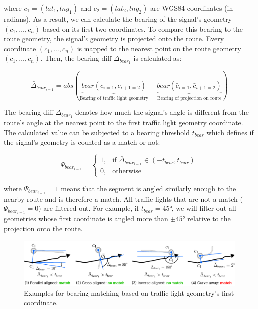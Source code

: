 where $c_1 = (lat_1, lng_1)$ and $c_2 = (lat_2, lng_2)$ are WGS84 coordinates (in radians). As a result, we can calculate the bearing of the signal's geometry $(c_1, \dots, c_n)$ based on its first two coordinates. To compare this bearing to the route geometry, the signal's geometry is projected onto the route. Every coordinate $(c_1, \dots, c_n)$ is mapped to the nearest point on the route geometry $(\bar{c_1}, \dots, \bar{c_n})$. Then, the bearing diff $\bar{\Delta}_{bear_1}$ is calculated as:

\begin{equation}
    \bar{\Delta}_{bear_{i=1}} = 
        abs(\underbrace{bear(c_{i=1}, c_{i+1=2})}_{\text{Bearing of traffic light geometry}} - \underbrace{bear(\bar{c}_{i=1}, \bar{c}_{i+1=2})}_{\text{Bearing of projection on route}})
\end{equation}

The bearing diff $\bar{\Delta}_{bear_1}$ denotes how much the signal's angle is different from the route's angle at the nearest point to the first traffic light geometry coordinate. The calculated value can be subjected to a bearing threshold $t_{bear}$ which defines if the signal's geometry is counted as a match or not:

\begin{equation}
\Psi_{bear_{i=1}} = 
    \begin{cases}
            1,& \text{if } \bar{\Delta}_{bear_{i=1}} \in \left(-t_{bear}, t_{bear}\right)\\
            0,              & \text{otherwise}
        \end{cases}
\end{equation}

where $\Psi_{bear_{i=1}} = 1$ means that the segment is angled similarly enough to the nearby route and is therefore a match. All traffic lights that are not a match ($\Psi_{bear_{i=1}} = 0$) are filtered out. For example, if $t_{bear} = 45°$, we will filter out all geometries whose first coordinate is angled more than $\pm 45°$ relative to the projection onto the route. 

\begin{figure}[b]
\centering
\includegraphics[width=\linewidth]{images/sg-selection-bearing-filter.pdf}
\caption{Examples for bearing matching based on traffic light geometry's first coordinate.}
\label{fig:sg-selection-bearing-filter}
\end{figure}

